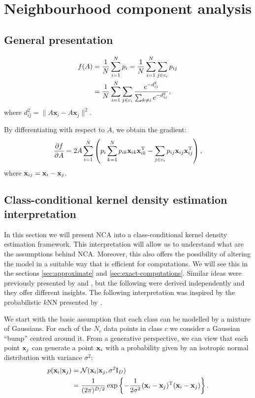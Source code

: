 \chapter{Neighbourhood component analysis}

\section{General presentation}
\label{sec:general-presentation}

\begin{align}
 f(A) &= \frac{1}{N}\sum_{i=1}^Np_i=\frac{1}{N}\sum_{i=1}^N\sum_{j\in c_i}p_{ij}\notag\\
 &= \frac{1}{N}\sum_{i=1}^N\sum_{j\in c_i}\frac{e^{-d_{ij}^2}}{\sum_{k\neq i}e^{-d_{ij}^2}}\label{eq:nca-obj},
\end{align}
 where $d_{ij}^2=\lVert A\mathbf{x}_i-A\mathbf{x}_j\lVert^2$.

By differentiating with respect to $A$, we obtain the gradient:
\begin{align}
  \frac{\partial f}{\partial A}=2A\sum_{i=1}^{N}\left(p_i\sum_{k=1}^Np_{ik}\mathbf{x}_{ik}\mathbf{x}_{ik}^{\textrm{T}} - \sum_{j\in c_i}p_{ij}\mathbf{x}_{ij}\mathbf{x}_{ij}^{\textrm{T}} \right)\label{eq:nca-grad},
\end{align}
where $\mathbf{x}_{ij} = \mathbf{x}_i - \mathbf{x}_j$. 

\section{Class-conditional kernel density estimation interpretation}
\label{sec:cc-kde}

In this section we will present NCA into a class-conditional kernel density estimation framework. This interpretation will allow us to understand what are the assumptions behind NCA. Moreover, this also offers the possibility of altering the model in a suitable way that is efficient for computations. We will see this in the sections \ref{sec:approximate} and \ref{sec:exact-computations}. Similar ideas were previously presented by and , but the following were derived independently and they offer different insights. The following interpretation was inspired by the probabilistic $k$NN presented by \citet{barber2011}.

We start with the basic assumption that each class can be modelled by a mixture of Gaussians. For each of the $N_c$ data points in class $c$ we consider a Gaussian ``bump'' centred around it. From a generative perspective, we can view that each point $\mathbf{x}_j$ can generate a point $\mathbf{x}_i$ with a probability given by an isotropic normal distribution with variance $\sigma^2$:
\begin{align}
	p(\mathbf{x}_i|\mathbf{x}_j) &= \mathcal{N}(\mathbf{x}_i|\mathbf{x}_j, \sigma^2\mathrm{I}_D) \\
				   &= \frac{1}{(2\pi)^{D/2}}\exp \left\{-\frac{1}{2\sigma^2} (\mathbf{x}_i - \mathbf{x}_j)^\mathrm{T}(\mathbf{x}_i - \mathbf{x}_j)\right\}.
\end{align}

